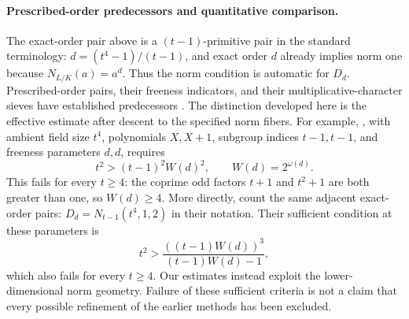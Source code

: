 \documentclass[11pt]{article}
\begin{document}
\paragraph{Prescribed-order predecessors and quantitative comparison.}
The exact-order pair above is a $(t-1)$-primitive pair in the
standard terminology: $d=(t^4-1)/(t-1)$, and exact order $d$
already implies norm one because $N_{L/K}(a)=a^d$.
Thus the norm condition is automatic for $D_d$.
Prescribed-order pairs, their freeness indicators, and their
multiplicative-character sieves have established predecessors
\cite{CKR22,AN22,SSL24}. The distinction developed here is the
effective estimate after descent to the specified norm fibers.
For example, \cite[Corollary~17]{CKR22}, with ambient field
size $t^4$, polynomials $X,X+1$, subgroup indices $t-1,t-1$,
and freeness parameters $d,d$, requires
\[
 t^2>(t-1)^2W(d)^2,\qquad W(d)=2^{\omega(d)}.
\]
This fails for every $t\ge4$: the coprime odd factors $t+1$
and $t^2+1$ are both greater than one, so $W(d)\ge4$.
More directly, \cite[Proposition~3.1 and Theorem~1]{SSL24}
count the same adjacent exact-order pairs:
$D_d=N_{t-1}(t^4,1,2)$ in their notation. Their sufficient
condition at these parameters is
\[
 t^2>\frac{((t-1)W(d))^3}{(t-1)W(d)-1},
\]
which also fails for every $t\ge4$.
Our estimates instead exploit the lower-dimensional norm geometry.
Failure of these sufficient criteria is not a claim that
every possible refinement of the earlier methods has been excluded.
\end{document}
